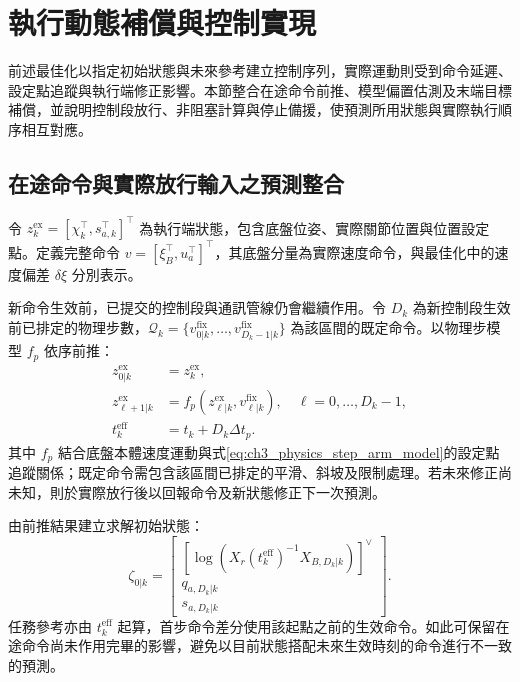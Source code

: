 
\section{執行動態補償與控制實現}
\label{sec:execution_compensation}

前述最佳化以指定初始狀態與未來參考建立控制序列，實際運動則受到命令延遲、設定點追蹤與執行端修正影響。本節整合在途命令前推、模型偏置估測及末端目標補償，並說明控制段放行、非阻塞計算與停止備援，使預測所用狀態與實際執行順序相互對應。


\subsection{在途命令與實際放行輸入之預測整合}
\label{subsec:queued_applied_command_prediction}

令 $z_k^{\mathrm{ex}}=[\chi_k^{\top},s_{a,k}^{\top}]^{\top}$ 為執行端狀態，包含底盤位姿、實際關節位置與位置設定點。定義完整命令 $v=[\xi_B^{\top},u_a^{\top}]^{\top}$，其底盤分量為實際速度命令，與最佳化中的速度偏差 $\delta\xi$ 分別表示。

新命令生效前，已提交的控制段與通訊管線仍會繼續作用。令 $D_k$ 為新控制段生效前已排定的物理步數，$\mathcal Q_k=\{v_{0|k}^{\mathrm{fix}},\ldots,v_{D_k-1|k}^{\mathrm{fix}}\}$ 為該區間的既定命令。以物理步模型 $f_p$ 依序前推：
\begin{equation}
    \begin{aligned}
        z_{0|k}^{\mathrm{ex}}&=z_k^{\mathrm{ex}},\\
        z_{\ell+1|k}^{\mathrm{ex}}
        &=f_p(z_{\ell|k}^{\mathrm{ex}},v_{\ell|k}^{\mathrm{fix}}),
          \quad \ell=0,\ldots,D_k-1,\\
        t_k^{\mathrm{eff}}&=t_k+D_k\Delta t_p.
    \end{aligned}
    \label{eq:ch3_queued_command_forward_prediction}
\end{equation}
其中 $f_p$ 結合底盤本體速度運動與式\eqref{eq:ch3_physics_step_arm_model}的設定點追蹤關係；既定命令需包含該區間已排定的平滑、斜坡及限制處理。若未來修正尚未知，則於實際放行後以回報命令及新狀態修正下一次預測。

由前推結果建立求解初始狀態：
\begin{equation}
    \zeta_{0|k}=
    \begin{bmatrix}
        \left[
          \log\left(X_r(t_k^{\mathrm{eff}})^{-1}
                    X_{B,D_k|k}\right)
        \right]^{\vee}\\
        q_{a,D_k|k}\\
        s_{a,D_k|k}
    \end{bmatrix}.
    \label{eq:ch3_delay_compensated_initial_state}
\end{equation}
任務參考亦由 $t_k^{\mathrm{eff}}$ 起算，首步命令差分使用該起點之前的生效命令。如此可保留在途命令尚未作用完畢的影響，避免以目前狀態搭配未來生效時刻的命令進行不一致的預測。

